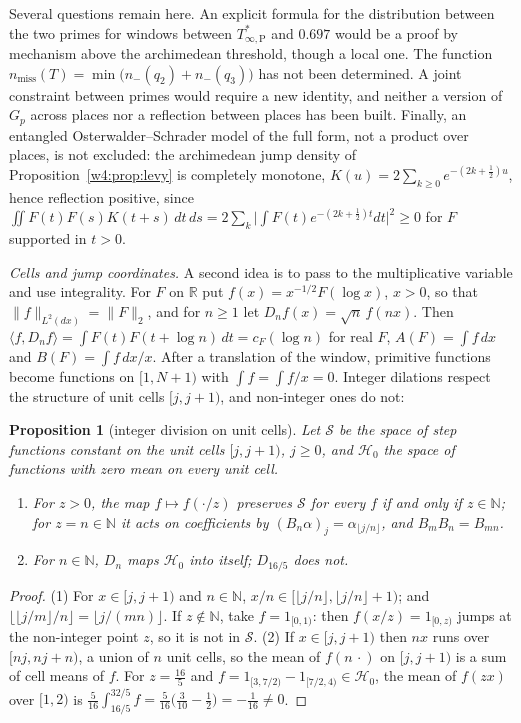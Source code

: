 \documentclass[11pt]{amsart}
\newtheorem{proposition}[theorem]{Proposition}
\theoremstyle{definition}
\theoremstyle{remark}
\numberwithin{equation}{section}
\newcommand{\R}{\mathbb{R}}
\newcommand{\N}{\mathbb{N}}
\newcommand{\cF}{c_F}                                  %
\newcommand{\Tarch}{T^{*}_{\infty,\mathrm P}}          %
\begin{document}
Several questions remain here. An explicit formula for the distribution between the two primes for windows between
$\Tarch$ and $0.697$ would be a proof by mechanism above the archimedean threshold, though a local one. The function
$n_{\mathrm{miss}}(T)=\min\big(n_-(q_2)+n_-(q_3)\big)$ has not been determined. A joint constraint between primes would
require a new identity, and neither a version of $G_p$ across places nor a reflection between places has been built.
Finally, an entangled Osterwalder--Schrader model of the full form, not a product over places, is not excluded: the
archimedean jump density of Proposition~\ref{w4:prop:levy} is completely monotone,
$K(u)=2\sum_{k\ge0}e^{-(2k+\frac12)u}$, hence reflection positive, since
$\iint F(t)F(s)K(t+s)\,dt\,ds=2\sum_k\big|\int F(t)e^{-(2k+\frac12)t}dt\big|^2\ge0$ for $F$ supported in $t>0$.

\label{w4:fam:R4}%
\emph{Cells and jump coordinates.} A second idea is to pass to the multiplicative variable and use integrality. For
$F$ on $\R$ put $f(x)=x^{-1/2}F(\log x)$, $x>0$, so that $\|f\|_{L^2(dx)}=\|F\|_2$, and for $n\ge1$ let
$D_nf(x)=\sqrt n\,f(nx)$. Then $\langle f,D_nf\rangle=\int F(t)F(t+\log n)\,dt=\cF(\log n)$ for real $F$,
$A(F)=\int f\,dx$ and $B(F)=\int f\,dx/x$. After a translation of the window, primitive functions become functions on
$[1,N+1)$ with $\int f=\int f/x=0$. Integer dilations respect the structure of unit cells $[j,j+1)$, and non-integer
ones do not:

\begin{proposition}[integer division on unit cells]\label{w4:prop:cells}
Let $\mathcal S$ be the space of step functions constant on the unit cells $[j,j+1)$, $j\ge0$, and $\mathcal H_0$ the space of functions
with zero mean on every unit cell.
\begin{enumerate}
\item For $z>0$, the map $f\mapsto f(\cdot/z)$ preserves $\mathcal S$ for every $f$ if and only if $z\in\N$; for $z=n\in\N$ it acts on
coefficients by $(B_n\alpha)_j=\alpha_{\lfloor j/n\rfloor}$, and $B_mB_n=B_{mn}$.
\item For $n\in\N$, $D_n$ maps $\mathcal H_0$ into itself; $D_{16/5}$ does not.
\end{enumerate}
\end{proposition}

\begin{proof}
(1) For $x\in[j,j+1)$ and $n\in\N$, $x/n\in[\lfloor j/n\rfloor,\lfloor j/n\rfloor+1)$; and $\lfloor\lfloor j/m\rfloor/n\rfloor=\lfloor j/(mn)\rfloor$.
If $z\notin\N$, take $f=1_{[0,1)}$: then $f(x/z)=1_{[0,z)}$ jumps at the non-integer point $z$, so it is not in $\mathcal S$.
(2) If $x\in[j,j+1)$ then $nx$ runs over $[nj,nj+n)$, a union of $n$ unit cells, so the mean of $f(n\,\cdot)$ on $[j,j+1)$ is a sum of cell means of $f$.
For $z=\frac{16}5$ and $f=1_{[3,7/2)}-1_{[7/2,4)}\in\mathcal H_0$, the mean of $f(zx)$ over $[1,2)$ is $\frac5{16}\int_{16/5}^{32/5}f=\frac5{16}\big(\tfrac3{10}-\tfrac12\big)=-\tfrac1{16}\ne0$.
\end{proof}
\end{document}
